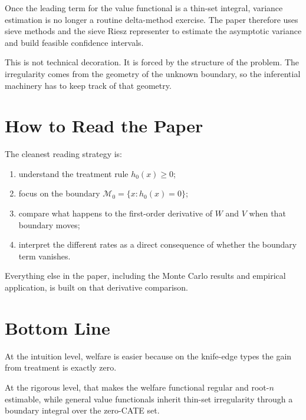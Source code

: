 \documentclass[11pt]{article}
\begin{document}
Once the leading term for the value functional is a thin-set integral, variance estimation is no longer a routine delta-method exercise. The paper therefore uses sieve methods and the sieve Riesz representer to estimate the asymptotic variance and build feasible confidence intervals.

This is not technical decoration. It is forced by the structure of the problem. The irregularity comes from the geometry of the unknown boundary, so the inferential machinery has to keep track of that geometry.

\section{How to Read the Paper}

The cleanest reading strategy is:
\begin{enumerate}
\item understand the treatment rule $h_0(x)\ge 0$;
\item focus on the boundary $\mathcal M_0=\{x:h_0(x)=0\}$;
\item compare what happens to the first-order derivative of $W$ and $V$ when that boundary moves;
\item interpret the different rates as a direct consequence of whether the boundary term vanishes.
\end{enumerate}

Everything else in the paper, including the Monte Carlo results and empirical application, is built on that derivative comparison.

\section{Bottom Line}

At the intuition level, welfare is easier because on the knife-edge types the gain from treatment is exactly zero.

At the rigorous level, that makes the welfare functional regular and root-$n$ estimable, while general value functionals inherit thin-set irregularity through a boundary integral over the zero-CATE set.
\end{document}
